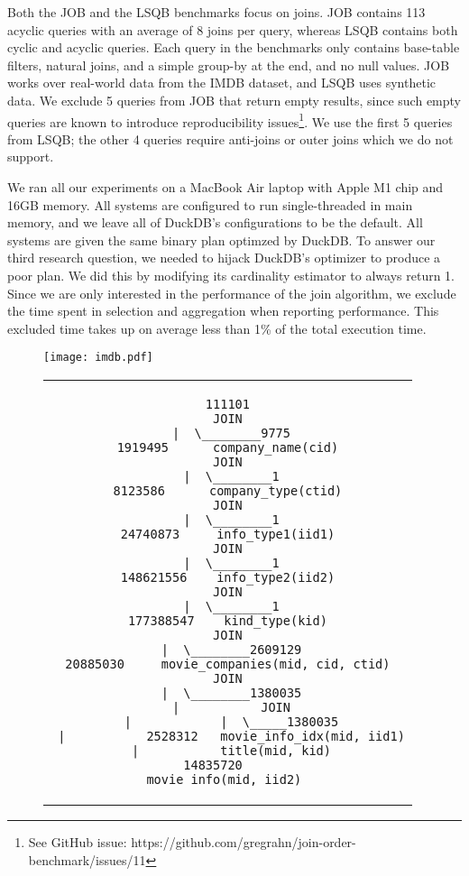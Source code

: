 
Both  the JOB and the LSQB benchmarks  focus on joins.
JOB contains 113 acyclic queries with an average of 8 joins per query,
whereas LSQB contains both cyclic and acyclic queries.
Each query in the benchmarks only contains base-table filters,
natural joins, and a simple group-by at the end,
and no null values.
JOB works over real-world data from the IMDB dataset,
and LSQB uses synthetic data.
We exclude 5 queries from JOB that return empty results,
since such empty queries are known to introduce reproducibility issues\footnote{
  See GitHub issue: https://github.com/gregrahn/join-order-benchmark/issues/11
}.
We use the first 5 queries from LSQB; the other 4 queries require
anti-joins or outer joins which we do not support.

We ran all our experiments on a MacBook Air laptop with Apple M1 chip and 16GB memory.
All systems are configured to run single-threaded in main memory,
and we leave all of DuckDB's configurations to be the default.
All systems are given the same binary plan optimzed by DuckDB.
To answer our third research question,
we needed to hijack DuckDB's optimizer to produce a poor plan.
We did this by modifying its cardinality estimator to always return 1.
Since we are only interested in the performance of the join algorithm,
we exclude the time spent in selection and aggregation
when reporting performance.
This excluded time takes up on average less than 1\% of the total execution time.

\begin{figure}
  \centering
  \texttt{[image: imdb.pdf]}
  \label{fig:eval:imdb}
\end{figure}%

\begin{figure}
  \centering
  \begin{tabular}{c}
    \begin{lstlisting}[numbers=none]
111101
JOIN
 |  \________9775
1919495      company_name(cid)
JOIN
 |  \________1
8123586      company_type(ctid)
JOIN
 |  \________1
24740873     info_type1(iid1)
JOIN
 |  \________1
148621556    info_type2(iid2)
JOIN
 |  \________1
177388547    kind_type(kid)
JOIN
 |  \________2609129
20885030     movie_companies(mid, cid, ctid)
JOIN
 |  \________1380035
 |           JOIN
 |            |  \_____1380035
 |           2528312   movie_info_idx(mid, iid1)
 |           title(mid, kid)
14835720    
movie_info(mid, iid2) 
\end{lstlisting}
  \end{tabular}
\end{figure}



